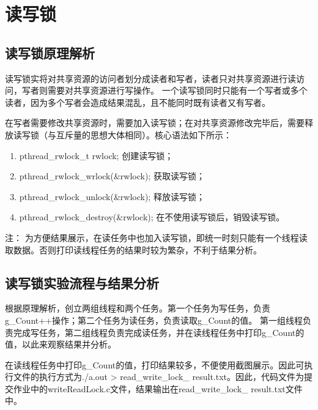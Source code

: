 \documentclass[11pt]{ctexart}
\newenvironment{note}{\kaishu 注：}{}
\begin{document}
\section{读写锁}

\subsection{读写锁原理解析}

读写锁实将对共享资源的访问者划分成读者和写者，读者只对共享资源进行读访问，写者则需要对共享资源进行写操作。
一个读写锁同时只能有一个写者或多个读者，因为多个写者会造成结果混乱，且不能同时既有读者又有写者。

在写者需要修改共享资源时，需要加入读写锁；在对共享资源修改完毕后，需要释放读写锁（与互斥量的思想大体相同）。核心语法如下所示：

\begin{enumerate}
    \item {\ttfamily pthread\_rwlock\_t rwlock;} 创建读写锁；
    \item {\ttfamily pthread\_rwlock\_wrlock(\&rwlock);} 获取读写锁；
    \item {\ttfamily pthread\_rwlock\_unlock(\&rwlock);} 释放读写锁；
    \item {\ttfamily pthread\_rwlock\_destroy(\&rwlock);} 在不使用读写锁后，销毁读写锁。
\end{enumerate}

\begin{note}
    为方便结果展示，在读任务中也加入读写锁，即统一时刻只能有一个线程读取数据。否则打印读线程任务的结果时较为繁杂，不利于结果分析。
\end{note}

\subsection{读写锁实验流程与结果分析}

根据原理解析，创立两组线程和两个任务。第一个任务为写任务，负责{\ttfamily g\_Count++}操作；第二个任务为读任务，负责读取{\ttfamily g\_Count}的值。
第一组线程负责完成写任务，第二组线程负责完成读任务，并在读线程任务中打印{\ttfamily g\_Count}的值，以此来观察结果并分析。

在读线程任务中打印{\ttfamily g\_Count}的值，打印结果较多，不便使用截图展示。因此可执行文件的执行方式为{\ttfamily ./a.out > read\_write\_lock\_
result.txt}。因此，代码文件为提交作业中的{\ttfamily writeReadLock.c}文件，结果输出在{\ttfamily read\_write\_lock\_
result.txt}文件中。
\end{document}
